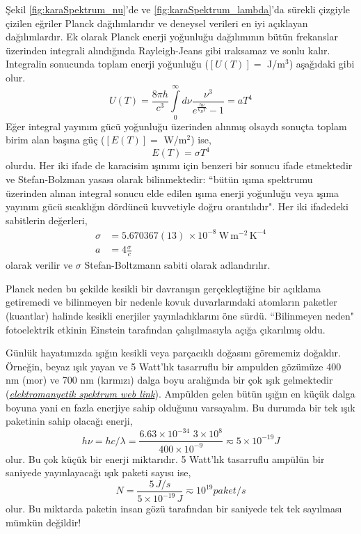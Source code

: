 \documentclass[a4paper,12pt, twoside]{article}
\begin{document}
Şekil \ref{fig:karaSpektrum_nu}'de ve \ref{fig:karaSpektrum_lambda}'da sürekli çizgiyle çizilen eğriler Planck dağılımlarıdır ve deneysel verileri en iyi açıklayan dağılımlardır. Ek olarak Planck enerji yoğunluğu dağılımının bütün frekanslar üzerinden integrali alındığında Rayleigh-Jeans gibi ıraksamaz ve sonlu kalır. Integralin sonucunda toplam enerji yoğunluğu ($[U(T)]=$ J/m$^3$) aşağıdaki gibi olur.
\begin{equation}
\label{eq:Planck_U_total}
U(T) = \frac{8 \pi h}{c^{3}} \int\limits_0^\infty d\nu \frac{\nu^{3}}{e^{\frac{h \nu}{k_{B} T}} - 1} = a T^4
\end{equation}
Eğer integral yayınım gücü yoğunluğu üzerinden alınmış olsaydı sonuçta toplam birim alan başına güç ($[E(T)]=$ W/m$^2$) ise,
\begin{equation}
\label{eq:Planck_E_total}
E(T) = \sigma T^4
\end{equation}
olurdu. Her iki ifade de karacisim ışınımı için benzeri bir sonucu ifade etmektedir ve Stefan-Bolzman yasası olarak bilinmektedir: ``bütün ışıma spektrumu üzerinden alınan integral sonucu elde edilen ışıma enerji yoğunluğu veya ışıma yayınım gücü sıcaklığın dördüncü kuvvetiyle doğru orantılıdır". Her iki ifadedeki sabitlerin değerleri,
\begin{align}
\label{eq:stefan_boltzman}
\sigma &=  5.670367(13) \, \times 10^{-8}\ \textrm{W}\,\textrm{m}^{-2}\,\textrm{K}^{-4} \\
a &= 4\frac{\sigma}{c} \nonumber
\end{align}
olarak verilir ve $\sigma$ Stefan-Boltzmann sabiti \cite{codata:stefan_boltzman} olarak adlandırılır.


Planck neden bu şekilde kesikli bir davranışın gerçekleştiğine bir açıklama getiremedi ve bilinmeyen bir nedenle kovuk duvarlarındaki atomların paketler (kuantlar) halinde kesikli enerjiler yayınladıklarını öne sürdü. ``Bilinmeyen neden" fotoelektrik etkinin Einstein tarafından çalışılmasıyla açığa çıkarılmış oldu.

Günlük hayatımızda ışığın kesikli veya parçacıklı doğasını görememiz doğaldır. Örneğin, beyaz ışık yayan ve 5 Watt'lık tasarruflu bir ampulden gözümüze 400 nm (mor) ve 700 nm (kırmızı) dalga boyu aralığında bir çok ışık gelmektedir ({\it \href {https://upload.wikimedia.org/wikipedia/commons/2/25/Electromagnetic-Spectrum.svg}{elektromanyetik spektrum web link}}). Ampülden gelen bütün ışığın en küçük dalga boyuna yani en fazla enerjiye sahip olduğunu varsayalım. Bu durumda bir tek ışık paketinin sahip olacağı enerji,
\begin{equation}
\label{eq:example_light_quanta01}
h\nu = h c/\lambda = \frac{6.63\times10^{-34}\,\,3\times10^{8}}{400\times10^{-9}} \eqsim 5\times 10^{-19} J 
\end{equation}
olur. Bu çok küçük bir enerji miktarıdır. 5 Watt'lık tasarruflu ampülün bir saniyede yayınlayacağı ışık paketi sayısı ise,
\begin{equation}
\label{eq:example_light_quanta02}
N = \frac{5\,J/s}{5\times10^{-19}\,J} \eqsim 10^{19} paket/s
\end{equation}
olur. Bu miktarda paketin insan gözü tarafından bir saniyede tek tek sayılması mümkün değildir!
\end{document}
